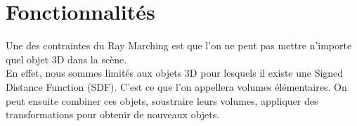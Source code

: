 \section{Fonctionnalités}
Une des contraintes du Ray Marching est que l'on ne peut pas mettre n'importe quel objet 3D dans la scène.\\
En effet, nous sommes limités aux objets 3D pour lesquels il existe une Signed Distance Function (SDF). C'est ce que l'on appellera volumes élémentaires. On peut ensuite combiner ces objets, soustraire leurs volumes, appliquer des transformations pour obtenir de nouveaux objets.



